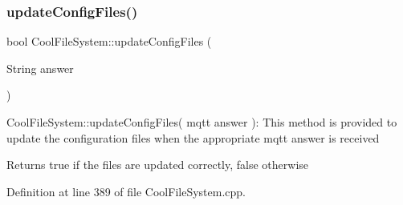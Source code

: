 \subsubsection{\texorpdfstring{update\+Config\+Files()}{updateConfigFiles()}}
{\footnotesize\ttfamily bool Cool\+File\+System\+::update\+Config\+Files (\begin{DoxyParamCaption}\item[{String}]{answer }\end{DoxyParamCaption})}

Cool\+File\+System\+::update\+Config\+Files( mqtt answer )\+: This method is provided to update the configuration files when the appropriate mqtt answer is received

\begin{DoxyReturn}{Returns}
true if the files are updated correctly, false otherwise 
\end{DoxyReturn}


Definition at line 389 of file Cool\+File\+System.\+cpp.


